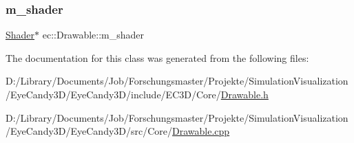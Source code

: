 \subsubsection{\texorpdfstring{m\+\_\+shader}{m\_shader}}
{\footnotesize\ttfamily \mbox{\hyperlink{classec_1_1_shader}{Shader}}$\ast$ ec\+::\+Drawable\+::m\+\_\+shader\hspace{0.3cm}{\ttfamily [protected]}}



The documentation for this class was generated from the following files\+:\begin{DoxyCompactItemize}
\item 
D\+:/\+Library/\+Documents/\+Job/\+Forschungsmaster/\+Projekte/\+Simulation\+Visualization/\+Eye\+Candy3\+D/\+Eye\+Candy3\+D/include/\+E\+C3\+D/\+Core/\mbox{\hyperlink{_drawable_8h}{Drawable.\+h}}\item 
D\+:/\+Library/\+Documents/\+Job/\+Forschungsmaster/\+Projekte/\+Simulation\+Visualization/\+Eye\+Candy3\+D/\+Eye\+Candy3\+D/src/\+Core/\mbox{\hyperlink{_drawable_8cpp}{Drawable.\+cpp}}\end{DoxyCompactItemize}
